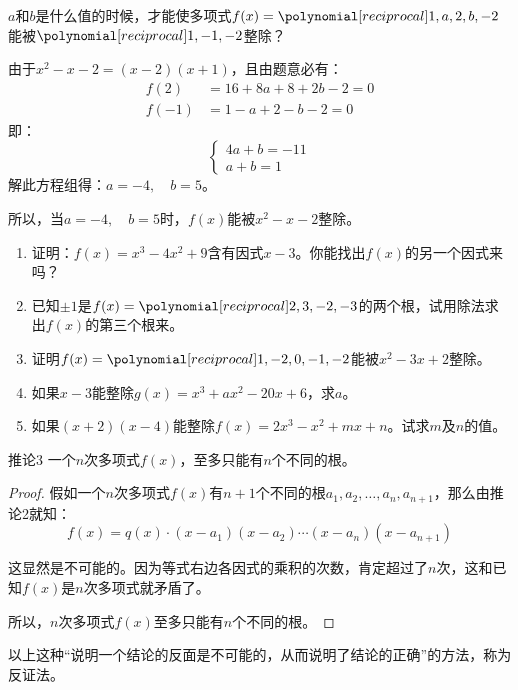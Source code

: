 \begin{example}
    $a$和$b$是什么值的时候，才能使多项式$f(x)=\poly{1,a,2,b,-2}$能被$\poly{1,-1,-2}$整除？
\end{example}

\begin{solution}
由于$x^2-x-2=(x-2)(x+1)$，且由题意必有：
\[\begin{split}
    f(2) &= 16+8a+8+2b-2=0\\
    f(-1)&=1-a+2-b-2=0
\end{split}\]
即：\[\begin{cases}
    4a+b=-11\\
    a+b=1
\end{cases}\]
解此方程组得：$a=-4,\quad b=5$。

所以，当$a=-4,\quad b=5$时，$f(x)$能被$x^2-x-2$整除。
\end{solution}

\begin{ex}
\begin{enumerate}
    \item 证明：$f(x)=x^3-4x^2+9$含有因式$x-3$。你能找出$f(x)$的另一个因式来吗？
    \item 已知$\pm 1$是$f(x)=\poly{2,3,-2,-3}$的两个根，试用除法求出$f(x)$的第三个根来。
    \item 证明$f(x)=\poly{1,-2,0,-1,-2}$能被$x^2-3x+2$整除。
    \item 如果$x-3$能整除$g(x)=x^3+ax^2-20x+6$，求$a$。
    \item 如果$(x+2)(x-4)$能整除$f(x)=2x^3-x^2+mx+n$。试求$m$及$n$的值。
\end{enumerate}
\end{ex}

\begin{blk}{推论3}
    一个$n$次多项式$f(x)$，至多只能有$n$个不同的根。
\end{blk}

\begin{proof}
假如一个$n$次多项式$f(x)$有$n+1$个不同的根$a_1,a_2,\ldots,a_n,a_{n+1}$，那么由推论2就知：
\[f (x) =q (x) \cdot  (x-a_1) (x-a_2)\cdots (x-a_n)(x-a_{n+1})\] 

这显然是不可能的。因为等式右边各因式的乘积的次数，肯定超过了$n$次，这和已知$f(x)$是$n$次多项式就矛盾了。

所以，$n$次多项式$f(x)$至多只能有$n$个不同的根。
\end{proof}

以上这种“说明一个结论的反面是不可能的，从而说明了结论的正确”的方法，称为反证法。

